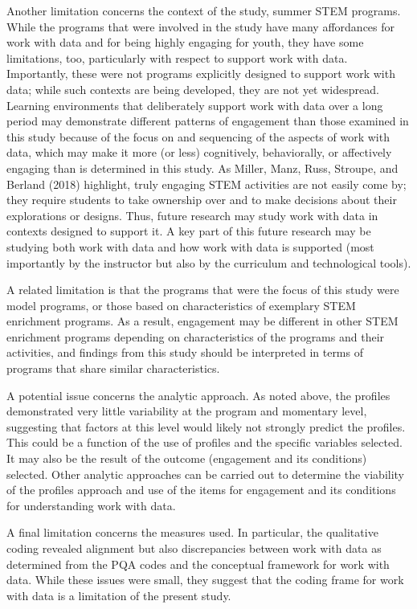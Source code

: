 \documentclass[]{msu-thesis}
\theoremstyle{definition}
\theoremstyle{definition}
\theoremstyle{definition}
\theoremstyle{remark}
\begin{document}
Another limitation concerns the context of the study, summer STEM
programs. While the programs that were involved in the study have many
affordances for work with data and for being highly engaging for youth,
they have some limitations, too, particularly with respect to support
work with data. Importantly, these were not programs explicitly designed
to support work with data; while such contexts are being developed, they
are not yet widespread. Learning environments that deliberately support
work with data over a long period may demonstrate different patterns of
engagement than those examined in this study because of the focus on and
sequencing of the aspects of work with data, which may make it more (or
less) cognitively, behaviorally, or affectively engaging than is
determined in this study. As Miller, Manz, Russ, Stroupe, and Berland
(2018) highlight, truly engaging STEM activities are not easily come by;
they require students to take ownership over and to make decisions about
their explorations or designs. Thus, future research may study work with
data in contexts designed to support it. A key part of this future
research may be studying both work with data and how work with data is
supported (most importantly by the instructor but also by the curriculum
and technological tools).

A related limitation is that the programs that were the focus of this
study were model programs, or those based on characteristics of
exemplary STEM enrichment programs. As a result, engagement may be
different in other STEM enrichment programs depending on characteristics
of the programs and their activities, and findings from this study
should be interpreted in terms of programs that share similar
characteristics.

A potential issue concerns the analytic approach. As noted above, the
profiles demonstrated very little variability at the program and
momentary level, suggesting that factors at this level would likely not
strongly predict the profiles. This could be a function of the use of
profiles and the specific variables selected. It may also be the result
of the outcome (engagement and its conditions) selected. Other analytic
approaches can be carried out to determine the viability of the profiles
approach and use of the items for engagement and its conditions for
understanding work with data.

A final limitation concerns the measures used. In particular, the
qualitative coding revealed alignment but also discrepancies between
work with data as determined from the PQA codes and the conceptual
framework for work with data. While these issues were small, they
suggest that the coding frame for work with data is a limitation of the
present study.
\end{document}

